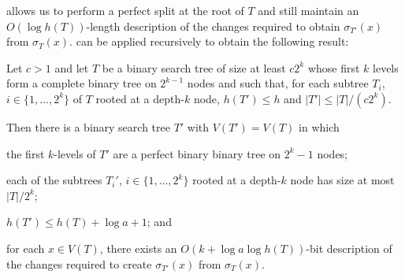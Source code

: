 \documentclass[kpfonts]{patmorin}
\begin{document}
 allows us to perform a perfect split at the root of $T$ and still maintain an $O(\log h(T))$-length description of the changes required to obtain $\sigma_{T'}(x)$ from $\sigma_T(x)$.   can be applied recursively to obtain the following result:

\begin{lem}
  Let $c>1$ and let $T$ be a binary search tree of size at least $c2^k$ whose first $k$ levels form a complete binary tree on $2^{k-1}$ nodes and such that, for each subtree $T_i$, $i\in\{1,\ldots,2^k\}$ of $T$ rooted at a depth-$k$ node, $h(T')\le h$ and $|T'|\le |T|/(c2^k)$.  

  Then there is a binary search tree $T'$ with $V(T')=V(T)$ in which
  \begin{compactenum}
    \item the first $k$-levels of $T'$ are a perfect binary binary tree on $2^k-1$ nodes;
    
    \item  each of the subtrees $T_i'$, $i\in\{1,\ldots,2^k\}$ rooted at a depth-$k$ node has size at most $|T|/2^k$;
    
    \item $h(T')\le h(T)+\log a+1$; and
    
    \item for each $x\in V(T)$, there exists an $O(k+\log a\log h(T))$-bit description of the changes required to create $\sigma_{T'}(x)$ from $\sigma_T(x)$.
  \end{compactenum}
\end{lem}
\end{document}
